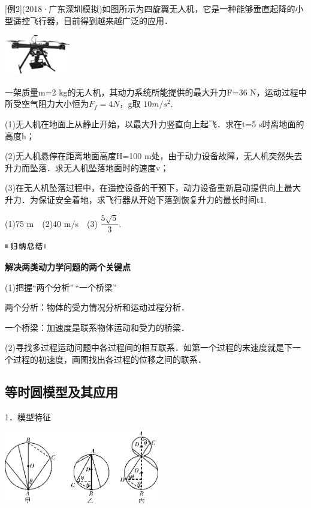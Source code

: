 {[}例2{]}(2018·广东深圳模拟)如图所示为四旋翼无人机，它是一种能够垂直起降的小型遥控飞行器，目前得到越来越广泛的应用．

\begin{center}\includegraphics[width=1.125in,height=0.69792in]{media/image106.png}\end{center}

一架质量m=2 kg的无人机，其动力系统所能提供的最大升力F=36
N，运动过程中所受空气阻力大小恒为$F_f=4 N$，g取 $10m/s^2$.

(1)无人机在地面上从静止开始，以最大升力竖直向上起飞．求在t=5
s时离地面的高度h；

(2)无人机悬停在距离地面高度H=100
m处，由于动力设备故障，无人机突然失去升力而坠落．求无人机坠落地面时的速度v；

(3)在无人机坠落过程中，在遥控设备的干预下，动力设备重新启动提供向上最大升力．为保证安全着地，求飞行器从开始下落到恢复升力的最长时间t1.
\begin{solution}
	(1)75 m　(2)40 m/s　(3) $\dfrac{5\sqrt{5}}{3}$.
\end{solution}


\begin{center}\includegraphics[width=0.70833in,height=0.125in]{media/image13.png}

\textbf{解决两类动力学问题的两个关键点}
\end{center}


(1)把握``两个分析''\,``一个桥梁''

两个分析：物体的受力情况分析和运动过程分析．

一个桥梁：加速度是联系物体运动和受力的桥梁．

(2)寻找多过程运动问题中各过程间的相互联系．如第一个过程的末速度就是下一个过程的初速度，画图找出各过程的位移之间的联系．

\subsection{等时圆模型及其应用}

1．模型特征

\begin{center}\includegraphics[width=2.66667in,height=1.25in]{media/image107.png}\end{center}

